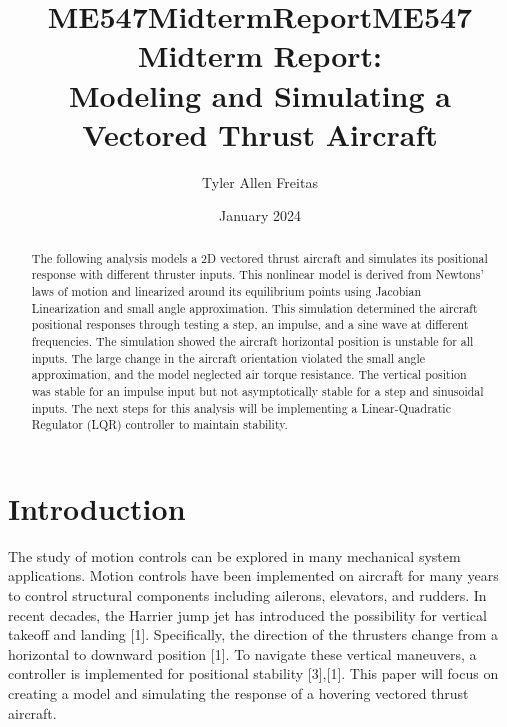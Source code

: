 \documentclass[conference]{IEEEtran}
\begin{document}
\title{ME547MidtermReport}
\author{Tyler Allen Freitas}
\date{January 2024}

\title{ME547 Midterm Report: \\ Modeling and Simulating a Vectored Thrust Aircraft}

\author{
}

\maketitle

\begin{abstract}
The following analysis models a 2D vectored thrust aircraft and simulates its positional response with different thruster inputs. This nonlinear model is derived from Newtons' laws of motion and linearized around its equilibrium points using Jacobian Linearization and small angle approximation. This simulation determined the aircraft positional responses through testing a step, an impulse, and a sine wave at different frequencies. The simulation showed the aircraft horizontal position is unstable for all inputs. The large change in the aircraft orientation violated the small angle approximation, and the model neglected air torque resistance. The vertical position was stable for an impulse input but not asymptotically stable for a step and sinusoidal inputs. The next steps for this analysis will be implementing a Linear-Quadratic Regulator (LQR) controller to maintain stability.
\end{abstract}


\section{Introduction}
The study of motion controls can be explored in many mechanical system applications. Motion controls have been implemented on aircraft for many years to control structural components including ailerons, elevators, and rudders. In recent decades, the Harrier jump jet has introduced the possibility for vertical takeoff and landing [1]. Specifically, the direction of the thrusters  change from a horizontal to downward position [1]. To navigate these vertical maneuvers, a controller is implemented for positional stability [3],[1]. This paper will focus on creating a model and simulating the response of a hovering vectored thrust aircraft.  
\end{document}
